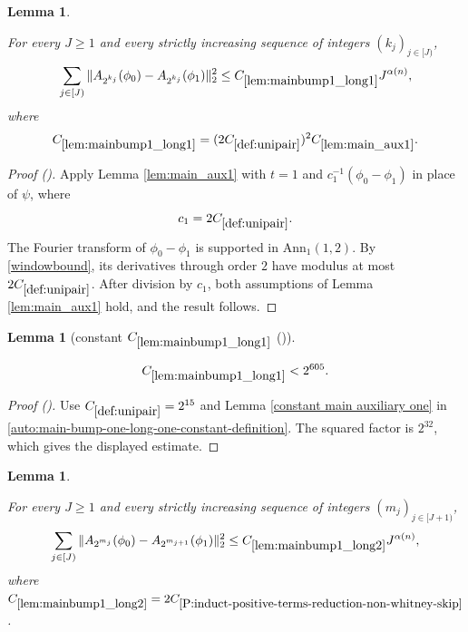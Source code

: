 \documentclass[12pt,reqno]{amsart}
\newcommand{\auto}{{({\tiny\faCar})}}
\theoremstyle{plain}
\newtheorem{lemma}[theorem]{Lemma}
\numberwithin{equation}{section}
\theoremstyle{remark}
\newcommand{\uses}[1]{}
\newcommand{\usesdefs}[1]{}
\newcommand{\leanok}{}
\newcommand{\lean}[1]{}
\begin{document}
\begin{lemma}\label{lem:mainbump1_long1}\uses{lem:main_aux1}\usesdefs{A_def,def:cn-window,def:unipair}
\lean{Auto.mainBumpOneLongOne}
\leanok
For every $J\ge1$ and every strictly increasing sequence of integers $(k_j)_{j\in[J)}$,
\begin{equation}\label{mainbump1_long1}
\sum_{j\in[J)}\|A_{2^{k_j}}(\phi_0)-A_{2^{k_j}}(\phi_1)\|_2^2
\le C_{\ref{lem:mainbump1_long1}}J^{\alpha(n)},
\end{equation}
where
\begin{equation}\label{auto:main-bump-one-long-one-constant-definition}
C_{\ref{lem:mainbump1_long1}}
=(2C_{\ref{def:unipair}})^2C_{\ref{lem:main_aux1}}.
\end{equation}
\end{lemma}

\begin{proof}[Proof \auto]
Apply Lemma \ref{lem:main_aux1} with $t=1$ and $c_1^{-1}(\phi_0-\phi_1)$ in place of $\psi$, where
\[
c_1=2C_{\ref{def:unipair}}.
\]
The Fourier transform of $\phi_0-\phi_1$ is supported in $\mathrm{Ann}_1(1,2)$. By \eqref{windowbound}, its derivatives through order $2$ have modulus at most $2C_{\ref{def:unipair}}$. After division by $c_1$, both assumptions of Lemma \ref{lem:main_aux1} hold, and the result follows.
\end{proof}

\begin{lemma}[constant $C_{\ref{lem:mainbump1_long1}}$ \auto]\label{constant main bump one long one}\uses{constant main auxiliary one,lem:mainbump1_long1}\usesdefs{def:unipair}
\lean{Auto.constantMainBumpOneLongOne}
\leanok
\begin{equation}\label{constant main bump one long one bound}
C_{\ref{lem:mainbump1_long1}}<2^{605}.
\end{equation}
\end{lemma}
\begin{proof}[Proof \auto]
Use $C_{\ref{def:unipair}}=2^{15}$ and Lemma \ref{constant main auxiliary one} in \eqref{auto:main-bump-one-long-one-constant-definition}. The squared factor is $2^{32}$, which gives the displayed estimate.
\end{proof}

\begin{lemma}\label{lem:mainbump1_long2}\uses{Extension of sequences,A to Lambda,P:induct-positive-terms-reduction-non-whitney-skip,Operations on spaced sequences}\usesdefs{A_def,normalized function tuples,auto:prism-form-definition,multiplicatively spaced monotone sequences,def:unipair}
\lean{Auto.mainBumpOneLongTwo}
\leanok
For every $J\ge 1$ and every strictly increasing sequence of integers $(m_j)_{j\in[J+1)}$,
\begin{equation}\label{mainbump1_long2}
\sum_{j\in[J)} \|
A_{2^{m_{j}}}(\phi_0)-A_{2^{m_{j+1}}}(\phi_1) \|_{2}^2  \le C_{\ref{lem:mainbump1_long2}} J^{\alpha(n)},\end{equation}
where $C_{\ref{lem:mainbump1_long2}}=2 C_{\ref{P:induct-positive-terms-reduction-non-whitney-skip}}$.
\end{lemma}
\end{document}
